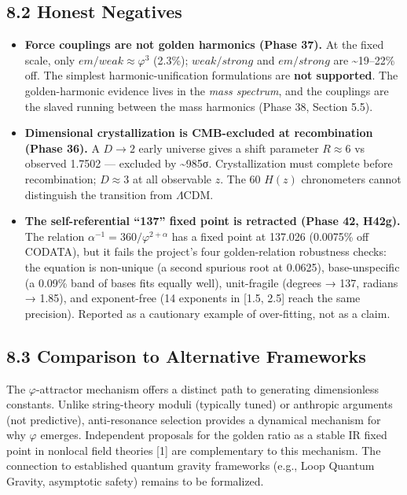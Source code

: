 \documentclass[
  11pt,
]{article}
\providecommand{\tightlist}{%
  \setlength{\itemsep}{0pt}\setlength{\parskip}{0pt}}
\begin{document}
\subsection{8.2 Honest Negatives}\label{honest-negatives}

\begin{itemize}
\tightlist
\item
  \textbf{Force couplings are not golden harmonics (Phase 37).} At the
  fixed scale, only \(em/weak \approx \varphi^3\) (2.3\%);
  \(weak/strong\) and \(em/strong\) are \textasciitilde19--22\% off. The
  simplest harmonic-unification formulations are \textbf{not supported}.
  The golden-harmonic evidence lives in the \emph{mass spectrum}, and
  the couplings are the slaved running between the mass harmonics (Phase
  38, Section 5.5).
\item
  \textbf{Dimensional crystallization is CMB-excluded at recombination
  (Phase 36).} A \(D \to 2\) early universe gives a shift parameter
  \(R \approx 6\) vs observed 1.7502 --- excluded by
  \textasciitilde985σ. Crystallization must complete before
  recombination; \(D \approx 3\) at all observable \(z\). The 60
  \(H(z)\) chronometers cannot distinguish the transition from
  \(\Lambda\)CDM.
\item
  \textbf{The self-referential ``137'' fixed point is retracted (Phase
  42, H42g).} The relation \(\alpha^{-1} = 360/\varphi^{2+\alpha}\) has
  a fixed point at 137.026 (0.0075\% off CODATA), but it fails the
  project's four golden-relation robustness checks: the equation is
  non-unique (a second spurious root at 0.0625), base-unspecific (a
  0.09\% band of bases fits equally well), unit-fragile (degrees → 137,
  radians → 1.85), and exponent-free (14 exponents in {[}1.5, 2.5{]}
  reach the same precision). Reported as a cautionary example of
  over-fitting, not as a claim.
\end{itemize}

\subsection{8.3 Comparison to Alternative
Frameworks}\label{comparison-to-alternative-frameworks}

The \(\varphi\)-attractor mechanism offers a distinct path to generating
dimensionless constants. Unlike string-theory moduli (typically tuned)
or anthropic arguments (not predictive), anti-resonance selection
provides a dynamical mechanism for why \(\varphi\) emerges. Independent
proposals for the golden ratio as a stable IR fixed point in nonlocal
field theories {[}1{]} are complementary to this mechanism. The
connection to established quantum gravity frameworks (e.g., Loop Quantum
Gravity, asymptotic safety) remains to be formalized.
\end{document}
